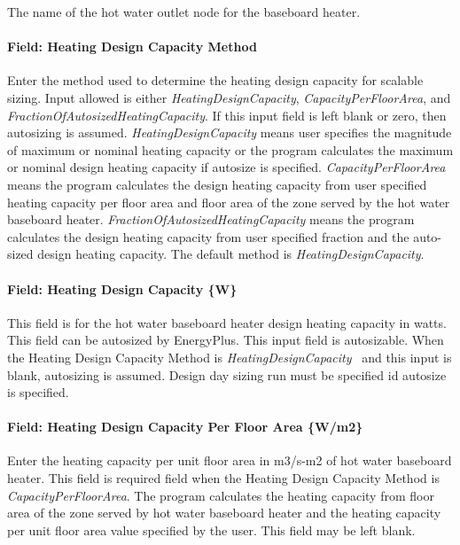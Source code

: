 The name of the hot water outlet node for the baseboard heater.

\paragraph{Field: Heating Design Capacity Method}\label{field-heating-design-capacity-method-3}

Enter the method used to determine the heating design capacity for scalable sizing. Input allowed is either \emph{HeatingDesignCapacity}, \emph{CapacityPerFloorArea}, and \emph{FractionOfAutosizedHeatingCapacity}. If this input field is left blank or zero, then autosizing is assumed. \emph{HeatingDesignCapacity} means user specifies the magnitude of maximum or nominal heating capacity or the program calculates the maximum or nominal design heating capacity if autosize is specified. \emph{CapacityPerFloorArea} means the program calculates the design heating capacity from user specified heating capacity per floor area and floor area of the zone served by the hot water baseboard heater. \emph{FractionOfAutosizedHeatingCapacity} means the program calculates the design heating capacity from user specified fraction and the auto-sized design heating capacity. The default method is \emph{HeatingDesignCapacity}.

\paragraph{Field: Heating Design Capacity \{W\}}\label{field-heating-design-capacity-w-3}

This field is for the hot water baseboard heater design heating capacity in watts. This field can be autosized by EnergyPlus. This input field is autosizable. When the Heating Design Capacity Method is \emph{HeatingDesignCapacity}~ and this input is blank, autosizing is assumed. Design day sizing run must be specified id autosize is specified.

\paragraph{Field: Heating Design Capacity Per Floor Area \{W/m2\}}\label{field-heating-design-capacity-per-floor-area-wm2-3}

Enter the heating capacity per unit floor area in m3/s-m2 of hot water baseboard heater. This field is required field when the Heating Design Capacity Method is \emph{CapacityPerFloorArea}. The program calculates the heating capacity from floor area of the zone served by hot water baseboard heater and the heating capacity per unit floor area value specified by the user. This field may be left blank.

